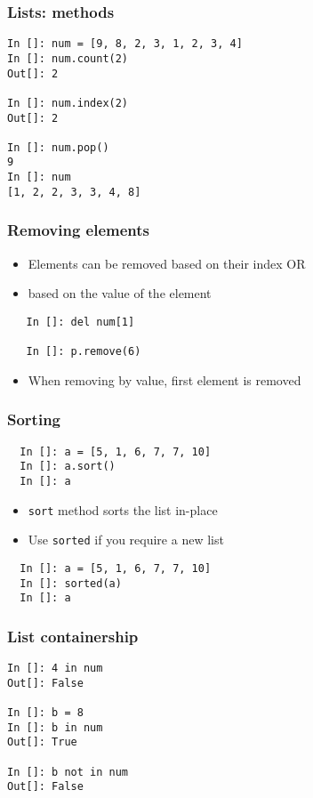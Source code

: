 \documentclass[14pt,compress]{beamer}
\begin{document}
\begin{frame}[fragile]
  \frametitle{Lists: methods}
  \begin{lstlisting}
In []: num = [9, 8, 2, 3, 1, 2, 3, 4]
In []: num.count(2)
Out[]: 2

In []: num.index(2)
Out[]: 2

In []: num.pop()
9
In []: num
[1, 2, 2, 3, 3, 4, 8]
  \end{lstlisting}
\end{frame}

\begin{frame}[fragile]
  \frametitle{Removing elements}
\begin{itemize}
  \item Elements can be removed based on their index OR
  \item based on the value of the element
  \end{itemize}
  \begin{lstlisting}
   In []: del num[1]

   In []: p.remove(6)
  \end{lstlisting}
  \begin{itemize}
  \item \alert{When removing by value, first element is removed}
  \end{itemize}
\end{frame}

\begin{frame}[fragile]
  \frametitle{Sorting}
  \begin{lstlisting}
  In []: a = [5, 1, 6, 7, 7, 10]
  In []: a.sort()
  In []: a
  \end{lstlisting}
  \begin{itemize}
  \item \texttt{sort} method sorts the list in-place
  \item Use \texttt{sorted} if you require a new list
  \end{itemize}
  \begin{lstlisting}
  In []: a = [5, 1, 6, 7, 7, 10]
  In []: sorted(a)
  In []: a
  \end{lstlisting}
\end{frame}

\begin{frame}[fragile]
\frametitle{List containership}
\begin{lstlisting}
In []: 4 in num
Out[]: False

In []: b = 8
In []: b in num
Out[]: True

In []: b not in num
Out[]: False
\end{lstlisting}
\end{frame}
\end{document}
